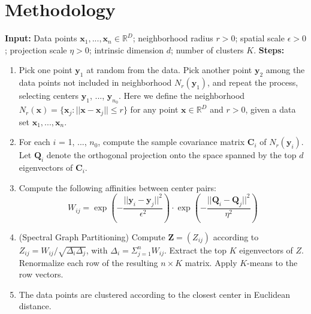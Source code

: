 \section{Methodology}
\vspace{0.1in}
\textbf{Input:} \newline
Data points $\boldsymbol{x}_1, ..., \boldsymbol{x}_n \in \mathbb{R}^D$; neighborhood radius $r>0$; spatial scale $\epsilon>0$; projection scale $\eta>0$; intrinsic dimension $d$; number of clusters $K$. \vspace{0.1in} \newline
\textbf{Steps:}
\begin{enumerate}
\item Pick one point $\boldsymbol{y}_1$ at random from the data. Pick another point $\boldsymbol{y}_2$ among the data points not included in neighborhood $N_r(\boldsymbol{y}_1)$, and repeat the process, selecting centers $\boldsymbol{y}_1$, ..., $\boldsymbol{y}_{n_0}$. Here we define the neighborhood $N_r(\boldsymbol{x})=\{\boldsymbol{x}_j : ||\boldsymbol{x}-\boldsymbol{x}_j|| \leqslant r\}$ for any point $\boldsymbol{x} \in \mathbb{R}^D$ and $r>0$, given a data set $\boldsymbol{x}_1, ..., \boldsymbol{x}_n$.
\item For each $i$ = 1, ..., $n_0$, compute the sample covariance matrix $\boldsymbol{C}_i$ of $N_r(\boldsymbol{y}_i)$. Let $\boldsymbol{Q}_i$ denote the orthogonal projection onto the space spanned by the top $d$ eigenvectors of $\boldsymbol{C}_i$.
\item Compute the following affinities between center pairs:
\begin{equation}
W_{ij}=\exp \left( -\frac{||\boldsymbol{y}_i-\boldsymbol{y}_j||^2}{\epsilon^2} \right) \cdot \exp \left(-\frac{||\boldsymbol{Q}_i-\boldsymbol{Q}_j||^2}{\eta^2} \right)
\end{equation}
\item (Spectral Graph Partitioning) Compute $\boldsymbol{Z} = (Z_{ij})$ according to $Z_{ij} = W_{ij}/\sqrt{\Delta_i \Delta_j}$, with $\Delta_i=\Sigma_{j=1}^{n} W_{ij}$. Extract the top $K$ eigenvectors of $Z$. Renormalize each row of the resulting $n \times K$ matrix. Apply $K$-means to the row vectors.
\item The data points are clustered according to the closest center in Euclidean distance.
\end{enumerate}


%   